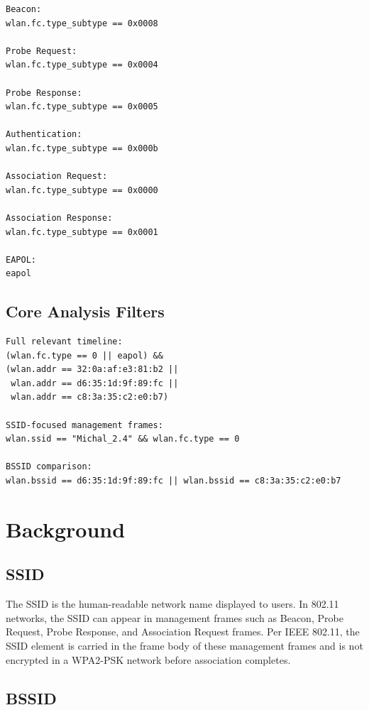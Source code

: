\documentclass[12pt,a4paper]{article}
\begin{document}
\begin{lstlisting}
Beacon:
wlan.fc.type_subtype == 0x0008

Probe Request:
wlan.fc.type_subtype == 0x0004

Probe Response:
wlan.fc.type_subtype == 0x0005

Authentication:
wlan.fc.type_subtype == 0x000b

Association Request:
wlan.fc.type_subtype == 0x0000

Association Response:
wlan.fc.type_subtype == 0x0001

EAPOL:
eapol
\end{lstlisting}

\subsection{Core Analysis Filters}

\begin{lstlisting}
Full relevant timeline:
(wlan.fc.type == 0 || eapol) &&
(wlan.addr == 32:0a:af:e3:81:b2 ||
 wlan.addr == d6:35:1d:9f:89:fc ||
 wlan.addr == c8:3a:35:c2:e0:b7)

SSID-focused management frames:
wlan.ssid == "Michal_2.4" && wlan.fc.type == 0

BSSID comparison:
wlan.bssid == d6:35:1d:9f:89:fc || wlan.bssid == c8:3a:35:c2:e0:b7
\end{lstlisting}

\section{Background}

\subsection{SSID}

The SSID is the human-readable network name displayed to users. In 802.11 networks, the SSID can appear in management frames such as Beacon, Probe Request, Probe Response, and Association Request frames. Per IEEE 802.11, the SSID element is carried in the frame body of these management frames and is not encrypted in a WPA2-PSK network before association completes.

\subsection{BSSID}
\end{document}
